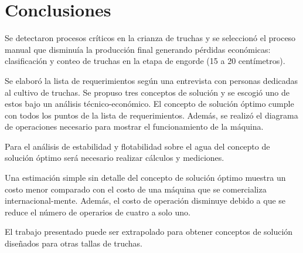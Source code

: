 
\pagestyle{myportland}
\doublespacing
\chapter*{\centering \large Conclusiones}
\thispagestyle{myportland}

Se detectaron procesos críticos en la crianza de truchas y se seleccionó el proceso manual que disminuía la producción final generando pérdidas económicas: clasificación y conteo de truchas en la etapa de engorde (15 a 20 centímetros).

Se elaboró la lista de requerimientos según una entrevista con personas dedicadas al cultivo de truchas. Se propuso tres conceptos de solución y se escogió uno de estos bajo un análisis técnico-económico. El concepto de solución óptimo cumple con todos los puntos de la lista de requerimientos. Además, se realizó el diagrama de operaciones necesario para mostrar el funcionamiento de la máquina.

Para el análisis de estabilidad y flotabilidad sobre el agua del concepto de solución óptimo será necesario realizar cálculos y mediciones.

Una estimación simple sin detalle del concepto de solución óptimo muestra un costo menor comparado con el costo de una máquina que se comercializa internacional-mente. Además, el costo de operación disminuye debido a que se reduce el número de operarios de cuatro a solo uno.

El trabajo presentado puede ser extrapolado para obtener conceptos de solución diseñados para otras tallas de truchas.